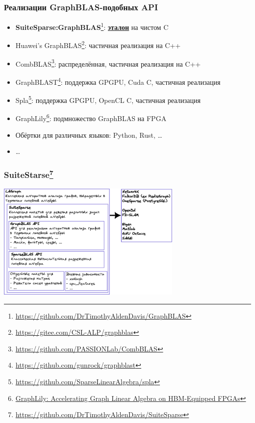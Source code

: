 \documentclass[xcolor=table,aspectratio=169]{beamer}
\begin{document}
\begin{frame}[fragile]
  \frametitle{Реализации GraphBLAS-подобных API}
  \begin{itemize}
      \item \textbf{SuiteSparse:GraphBLAS}\footnote{\url{https://github.com/DrTimothyAldenDavis/GraphBLAS}}: \underline{\textbf{эталон}} на чистом C
      \item Huawei's GraphBLAS\footnote{\url{https://gitee.com/CSL-ALP/graphblas}}: частичная реализация на C++
      \item CombBLAS\footnote{\url{https://github.com/PASSIONLab/CombBLAS}}: распределённая, частичная реализация на C++
      \item GraphBLAST\footnote{\url{https://github.com/gunrock/graphblast}}: поддержка GPGPU, Cuda C, частичная реализация
      \item Spla\footnote{\url{https://github.com/SparseLinearAlgebra/spla}}: поддержка GPGPU, OpenCL C, частичная реализация
      \item GraphLily\footnote{\href{https://dl.acm.org/doi/10.1109/ICCAD51958.2021.9643582}{GraphLily: Accelerating Graph Linear Algebra on HBM-Equipped FPGAs}}: подмножество GraphBLAS на FPGA
      \item Обёртки для различных языков: Python, Rust, \ldots
      \item \ldots
  \end{itemize}
\end{frame}

\begin{frame}[fragile]
  \frametitle{SuiteStarse\footnote{\url{https://github.com/DrTimothyAldenDavis/SuiteSparse}}}
  \begin{center}
      \includegraphics[width=0.68\textwidth]{pictures/SuiteSparse.pdf}
  \end{center}
\end{frame}
\end{document}
